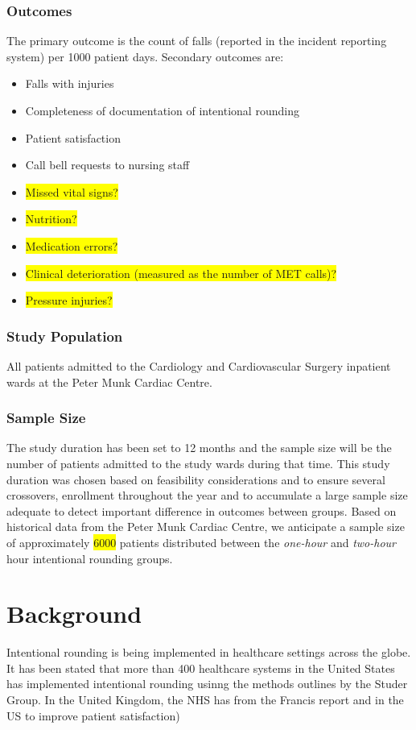 \documentclass[12pt]{article}
\begin{document}
\subsubsection*{Outcomes}
The primary outcome is the count of falls (reported in the incident reporting system) per 1000 patient days. Secondary outcomes are:
\begin{itemize}
    \item Falls with injuries
    \item Completeness of documentation of intentional rounding
    \item Patient satisfaction 
    \item Call bell requests to nursing staff
    \item \colorbox{yellow}{Missed vital signs?}
    \item \colorbox{yellow}{Nutrition?}
    \item \colorbox{yellow}{Medication errors?}
    \item \colorbox{yellow}{Clinical deterioration (measured as the number of MET calls)?}
    \item \colorbox{yellow}{Pressure injuries?}
\end{itemize}


\subsubsection*{Study Population}
All patients admitted to the Cardiology and Cardiovascular Surgery inpatient wards at the Peter Munk Cardiac Centre. 

\subsubsection*{Sample Size}
The study duration has been set to 12 months and the sample size will be the number of patients admitted to the study wards during that time. This study duration was chosen based on feasibility considerations and to ensure several crossovers, enrollment throughout the year and to accumulate a large sample size adequate to detect important difference in outcomes between groups. Based on historical data from the Peter Munk Cardiac Centre, we anticipate a sample size of approximately \colorbox{yellow}{6000} patients distributed between the \textit{one-hour} and \textit{two-hour} hour intentional rounding groups.


\section{Background}
Intentional rounding is being implemented in healthcare settings across the globe. It has been stated that more than 400 healthcare systems in the United States has implemented intentional rounding usinng the methods outlines by the Studer Group.\cite{studer2007} In the United Kingdom, the NHS has  from the Francis report and in the US to improve patient satisfaction)\cite{francis2013report}
\end{document}
